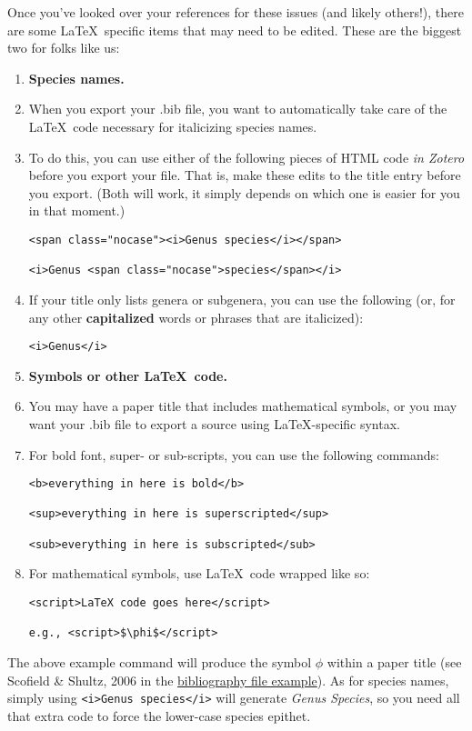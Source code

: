 \documentclass[11pt]{article}
\begin{document}
Once you've looked over your references for these issues (and likely others!), there are some \LaTeX\ specific items that may need to be edited. These are the biggest two for folks like us:


\begin{enumerate}
\item[]{\textbf{Species names.}}
\item[]{When you export your .bib file, you want to automatically take care of the \LaTeX\ code necessary for italicizing species names.} 
\item{To do this, you can use either of the following pieces of HTML code \textit{in Zotero} before you export your file. That is, make these edits to the title entry before you export. (Both will work, it simply depends on which one is easier for you in that moment.)
\begin{verbatim}
<span class="nocase"><i>Genus species</i></span>

<i>Genus <span class="nocase">species</span></i>
\end{verbatim}
}
\item{If your title only lists genera or subgenera, you can use the following (or, for any other \textbf{capitalized} words or phrases that are italicized):
\begin{verbatim}
<i>Genus</i>
\end{verbatim}
}
\pagebreak
\item[]{\textbf{Symbols or other \LaTeX\ code.}}
\item[]{You may have a paper title that includes mathematical symbols, or you may want your .bib file to export a source using \LaTeX-specific syntax.}
\item{For bold font, super- or sub-scripts, you can use the following commands:
\begin{verbatim}
<b>everything in here is bold</b>

<sup>everything in here is superscripted</sup>

<sub>everything in here is subscripted</sub>
\end{verbatim}
}
\item{For mathematical symbols, use \LaTeX\ code wrapped like so:
\begin{verbatim}
<script>LaTeX code goes here</script>

e.g., <script>$\phi$</script>
\end{verbatim}
}
\end{enumerate}

The above example command will produce the symbol $\phi$ within a paper title (see Scofield \& Shultz, 2006 in the \href{https://github.com/ledelaney/BibTeXforBrownLab/blob/master/ExampleFiles/RefsOnlyBib/MyImportantBibliography.pdf}{bibliography file example}). As for species names, simply using \verb|<i>Genus species</i>| will generate \textit{Genus Species}, so you need all that extra code to force the  lower-case species epithet.
\end{document}
